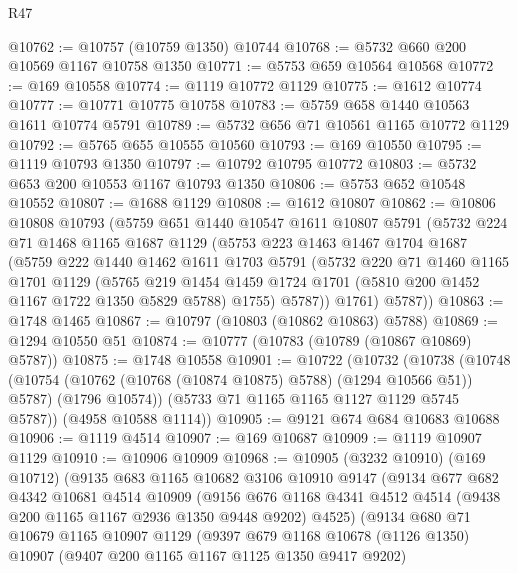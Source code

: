 \begin{lexlean}{R47}
\begin{coremodule}
@10762 := @10757 (@10759 @1350) @10744
@10768 := @5732 @660 @200 @10569 @1167 @10758 @1350
@10771 := @5753 @659 @10564 @10568
@10772 := @169 @10558
@10774 := @1119 @10772 @1129
@10775 := @1612 @10774
@10777 := @10771 @10775 @10758
@10783 := @5759 @658 @1440 @10563 @1611 @10774 @5791
@10789 := @5732 @656 @71 @10561 @1165 @10772 @1129
@10792 := @5765 @655 @10555 @10560
@10793 := @169 @10550
@10795 := @1119 @10793 @1350
@10797 := @10792 @10795 @10772
@10803 := @5732 @653 @200 @10553 @1167 @10793 @1350
@10806 := @5753 @652 @10548 @10552
@10807 := @1688 @1129
@10808 := @1612 @10807
@10862 := @10806
    @10808
    @10793
    (@5759
      @651
      @1440
      @10547
      @1611
      @10807
      @5791
      (@5732
        @224
        @71
        @1468
        @1165
        @1687
        @1129
        (@5753
          @223
          @1463
          @1467
          @1704
          @1687
          (@5759
            @222
            @1440
            @1462
            @1611
            @1703
            @5791
            (@5732
              @220
              @71
              @1460
              @1165
              @1701
              @1129
              (@5765
                @219
                @1454
                @1459
                @1724
                @1701
                (@5810 @200 @1452 @1167 @1722 @1350 @5829 @5788)
                @1755)
              @5787))
          @1761)
        @5787))
@10863 := @1748 @1465
@10867 := @10797 (@10803 (@10862 @10863) @5788)
@10869 := @1294 @10550 @51
@10874 := @10777 (@10783 (@10789 (@10867 @10869) @5787))
@10875 := @1748 @10558
@10901 := @10722
    (@10732
      (@10738
        (@10748
          (@10754 (@10762 (@10768 (@10874 @10875) @5788) (@1294 @10566 @51)) @5787)
          (@1796 @10574))
        (@5733 @71 @1165 @1165 @1127 @1129 @5745 @5787))
      (@4958 @10588 @1114))
@10905 := @9121 @674 @684 @10683 @10688
@10906 := @1119 @4514
@10907 := @169 @10687
@10909 := @1119 @10907 @1129
@10910 := @10906 @10909
@10968 := @10905
    (@3232 @10910)
    (@169 @10712)
    (@9135
      @683
      @1165
      @10682
      @3106
      @10910
      @9147
      (@9134
        @677
        @682
        @4342
        @10681
        @4514
        @10909
        (@9156 @676 @1168 @4341 @4512 @4514 (@9438 @200 @1165 @1167 @2936 @1350 @9448 @9202) @4525)
        (@9134
          @680
          @71
          @10679
          @1165
          @10907
          @1129
          (@9397
            @679
            @1168
            @10678
            (@1126 @1350)
            @10907
            (@9407 @200 @1165 @1167 @1125 @1350 @9417 @9202)

\end{coremodule}
\end{lexlean}

